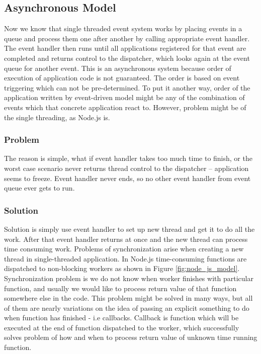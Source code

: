 \subsection{Asynchronous Model} %
\label{sub:asynchronous_code}
Now we know that single threaded event system works by placing events in a queue and process them one after another by calling appropriate event handler. The event handler then runs until all applications registered for that event are completed and returns control to the dispatcher, which looks again at the event queue for another event. This is an asynchronous system because order of execution of application code is not guaranteed. The order is based on event triggering which can not be pre-determined. To put it another way, order of the application written by event-driven model might be any of the combination of events which that concrete application react to. However, problem might be of the single threading, as Node.js is.
\subsubsection{Problem} %
\label{ssub:problem}
The reason is simple, what if event handler takes too much time to finish, or the worst case scenario never returns thread control to the dispatcher -- application seems to freeze. Event handler never ends, so no other event handler from event queue ever gets to run.
\subsubsection{Solution} %
\label{ssub:solution}
Solution is simply use event handler to set up new thread and get it to do all the work. After that event handler returns at once and the new thread can process time consuming work. Problems of synchronization arise when creating a new thread in single-threaded application. In Node.js time-consuming functions are dispatched to non-blocking workers as shown in Figure \ref{fig:node_js_model}. Synchronization problem is we do not know when worker finishes with particular function, and usually we would like to process return value of that function somewhere else in the code. This problem might be solved in many ways, but all of them are nearly variations on the idea of passing an explicit something to do when function has finished - i.e callbacks. Callback is function which will be executed at the end of function dispatched to the worker, which successfully solves problem of how and when to process return value of unknown time running function.\cite{asynch}




